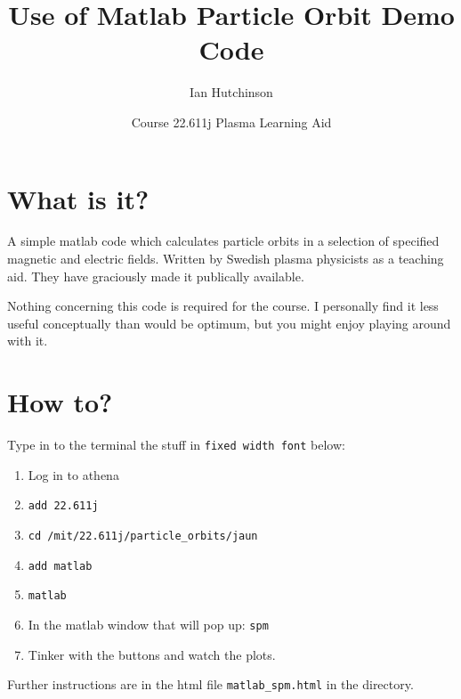 \documentclass[12pt]{article}
\begin{document}
\title{Use of Matlab Particle Orbit Demo Code}
\date{Course 22.611j Plasma Learning Aid}
\author{Ian Hutchinson}
\maketitle

\section{What is it?}

A simple matlab code which calculates particle orbits in a selection
of specified magnetic and electric fields. Written by Swedish plasma
physicists as a teaching aid. They have graciously made it publically
available. 

Nothing concerning this code is required for the course.  I personally
find it less useful conceptually than would be optimum, but you might
enjoy playing around with it.

\section{How to?}
Type in to the terminal the stuff in \verb!fixed width font! below:
\begin{enumerate}
\item Log in to athena
\item \verb!add 22.611j!
\item \verb!cd /mit/22.611j/particle_orbits/jaun!
\item \verb!add matlab!
\item \verb!matlab!
\item In the matlab window that will pop up: \verb!spm!
\item Tinker with the buttons and watch the plots.
\end{enumerate}

\noindent
 Further instructions are in the html
file \verb!matlab_spm.html! in the directory.
\end{document}
